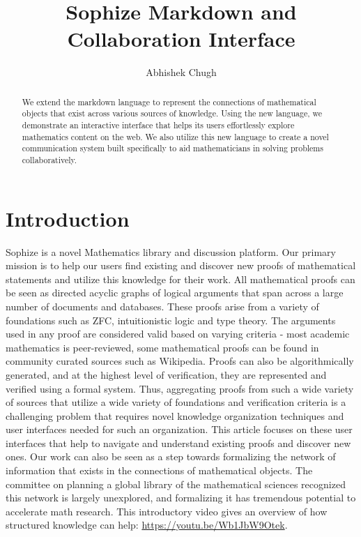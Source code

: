 \documentclass[a4paper]{article}
\title{Sophize Markdown and Collaboration Interface }
\author{
Abhishek Chugh
}
\begin{document}
\maketitle

\begin{abstract}
We extend the markdown language to represent the connections of mathematical objects that exist across various sources of knowledge. Using the new language, we demonstrate an interactive interface that helps its users effortlessly explore mathematics content on the web. We also utilize this new language to create a novel communication system built specifically to aid mathematicians in solving problems collaboratively.

\end{abstract}

\vskip 32pt

 

\section{Introduction}


Sophize is a novel Mathematics library and discussion platform. Our primary mission is to help our users find existing and discover new proofs of mathematical statements and utilize this knowledge for their work. All mathematical proofs can be seen as directed acyclic graphs of logical arguments that span across a large number of documents and databases. These proofs arise from a variety of foundations such as ZFC, intuitionistic logic and type theory. The arguments used in any proof are considered valid based on varying criteria - most academic mathematics is peer-reviewed, some mathematical proofs can be found in community curated sources such as Wikipedia. Proofs can also be algorithmically generated, and at the highest level of verification, they are represented and verified using a formal system. Thus, aggregating proofs from such a wide variety of sources that utilize a wide variety of foundations and verification criteria is a challenging problem that requires novel knowledge organization techniques and user interfaces needed for such an organization. This article focuses on these user interfaces that help to navigate and understand existing proofs and discover new ones.  Our work can also be seen as a step towards formalizing the network of information that exists in the connections of mathematical objects. The committee on planning a global library of the mathematical sciences recognized this network is largely unexplored, and formalizing it has tremendous potential to accelerate math research\cite{sciences2014developing}. This introductory video gives an overview of how structured knowledge can help: \url{https://youtu.be/Wb1JbW9Otek}.
\end{document}
